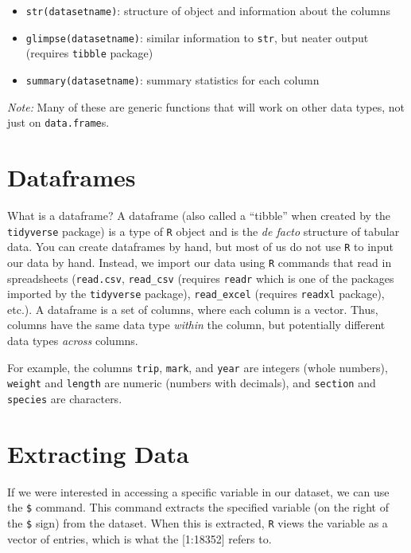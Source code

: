 \documentclass[
  10pt,
  letterpaper,
  twoside,
  openright]{book}
\providecommand{\tightlist}{%
  \setlength{\itemsep}{0pt}\setlength{\parskip}{0pt}}
\begin{document}
\begin{itemize}
  \begin{itemize}
  \tightlist
  \item
    \texttt{str(datasetname)}: structure of object and information about
    the columns\\
  \item
    \texttt{glimpse(datasetname)}: similar information to \texttt{str},
    but neater output (requires \texttt{tibble} package)\\
  \item
    \texttt{summary(datasetname)}: summary statistics for each column
  \end{itemize}
\end{itemize}

\emph{Note:} Many of these are generic functions that will work on other
data types, not just on \texttt{data.frame}s.

\hypertarget{dataframes}{%
\section{Dataframes}\label{dataframes}}

What is a dataframe? A dataframe (also called a ``tibble'' when created
by the \texttt{tidyverse} package) is a type of \texttt{R} object and is
the \emph{de facto} structure of tabular data. You can create dataframes
by hand, but most of us do not use \texttt{R} to input our data by hand.
Instead, we import our data using \texttt{R} commands that read in
spreadsheets (\texttt{read.csv}, \texttt{read\_csv} (requires
\texttt{readr} which is one of the packages imported by the
\texttt{tidyverse} package), \texttt{read\_excel} (requires
\texttt{readxl} package), etc.). A dataframe is a set of columns, where
each column is a vector. Thus, columns have the same data type
\emph{within} the column, but potentially different data types
\emph{across} columns.

For example, the columns \texttt{trip}, \texttt{mark}, and \texttt{year}
are integers (whole numbers), \texttt{weight} and \texttt{length} are
numeric (numbers with decimals), and \texttt{section} and
\texttt{species} are characters.

\hypertarget{extracting-data}{%
\section{Extracting Data}\label{extracting-data}}

If we were interested in accessing a specific variable in our dataset,
we can use the \texttt{\$} command. This command extracts the specified
variable (on the right of the \texttt{\$} sign) from the dataset. When
this is extracted, \texttt{R} views the variable as a vector of entries,
which is what the {[}1:18352{]} refers to.
\end{document}
